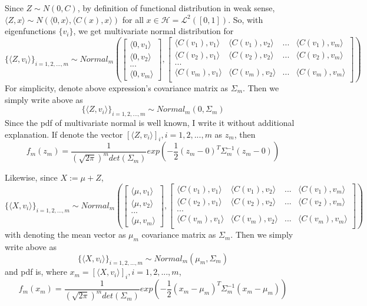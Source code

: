 \documentclass{article}
\begin{document}
Since $Z \sim N(0, C)$, by definition of functional distribution in weak sense,
\(\langle Z, x\rangle \sim N(\langle 0,x \rangle, \langle C(x),x\rangle)\) for all $x\in \mathcal{H}=\mathcal{L}^2([0,1])$.
So, with eigenfunctions $\{v_i\}$, we get multivariate normal distribution for
\[\{\langle Z, v_i\rangle\}_{i=1,2,...,m} \sim Normal_m(
\begin{bmatrix}
    \langle 0,v_1 \rangle \\
    \langle 0,v_2 \rangle \\
    ... \\
    \langle 0,v_m \rangle
\end{bmatrix}
,
\begin{bmatrix}
    \langle C(v_1),v_1 \rangle & \langle C(v_1),v_2 \rangle & ... & \langle C(v_1),v_m \rangle \\
    \langle C(v_2),v_1 \rangle & \langle C(v_2),v_2 \rangle & ... & \langle C(v_2),v_m \rangle \\
    ... \\
    \langle C(v_m),v_1 \rangle & \langle C(v_m),v_2 \rangle & ... & \langle C(v_m),v_m \rangle \\
\end{bmatrix}
)\]
For simplicity, denote above expression's covariance matrix as $\Sigma_m$. Then we simply write above as
\[\{\langle Z, v_i\rangle\}_{i=1,2,...,m} \sim Normal_m(0,\Sigma_m)\]
Since the pdf of multivariate normal is well known, I write it without additional explanation.
If denote the vector \([\langle Z, v_i\rangle]_i, i=1,2,...,m\) as $z_m$, then
\[
    f_m(z_m) = \frac{1}{(\sqrt{2\pi})^m det(\Sigma_m)}exp{(-\frac{1}{2}(z_m-0)^T\Sigma_m^{-1}(z_m-0))}
\]

Likewise, since $X:=\mu+Z$,
\[\{\langle X, v_i\rangle\}_{i=1,2,...,m} \sim Normal_m(
\begin{bmatrix}
    \langle \mu,v_1 \rangle \\
    \langle \mu,v_2 \rangle \\
    ... \\
    \langle \mu,v_m \rangle
\end{bmatrix}
,
\begin{bmatrix}
    \langle C(v_1),v_1 \rangle & \langle C(v_1),v_2 \rangle & ... & \langle C(v_1),v_m \rangle \\
    \langle C(v_2),v_1 \rangle & \langle C(v_2),v_2 \rangle & ... & \langle C(v_2),v_m \rangle \\
    ... \\
    \langle C(v_m),v_1 \rangle & \langle C(v_m),v_2 \rangle & ... & \langle C(v_m),v_m \rangle \\
\end{bmatrix}
)\]
with denoting the mean vector as $\mu_m$ covariance matrix as $\Sigma_m$. Then we simply write above as
\[\{\langle X, v_i\rangle\}_{i=1,2,...,m} \sim Normal_m(\mu_m,\Sigma_m)\]
and pdf is, where \(x_m=[\langle X, v_i\rangle]_i, i=1,2,...,m\),
\[
    f_m(x_m) = \frac{1}{(\sqrt{2\pi})^m det(\Sigma_m)}exp{(-\frac{1}{2}(x_m-\mu_m)^T\Sigma_m^{-1}(x_m-\mu_m))}
\]
\end{document}
